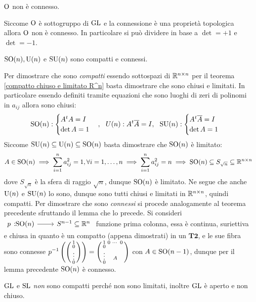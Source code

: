 \begin{corollary}
	$\operatorname{O}$ non è connesso.	
\end{corollary}
\begin{demonstration}
	Siccome $\operatorname{O}$ è sottogruppo di $\operatorname{GL}$ e la connessione è una proprietà topologica allora $\operatorname{O}$ non è connesso. In particolare si può dividere in base a $\det =+1$ e $\det =-1$.
\end{demonstration}

\begin{theorema}
	$\operatorname{SO}(n), \operatorname{U}(n)	$ e $\operatorname{SU}(n)$ sono compatti e connessi.
\end{theorema}
\begin{demonstration}
	Per dimostrare che sono \textit{compatti} essendo sottospazi di $\mathbb{R}^{n\times n}$ per il teorema \ref{compatto chiuso e limitato R^n} basta dimostrare che sono chiusi e limitati. In particolare essendo definiti tramite equazioni che sono luoghi di zeri di polinomi in $a_{ij}$ allora sono chiusi:
		\begin{gather*}
			\operatorname{SO}(n):\begin{cases}
					A^{t}A=I\\
					\det A=1
				\end{cases}, \ \
			U(n): A^{t}\overline{A}=I, \ \
			\operatorname{SU}(n): \begin{cases}
				A^{t}\overline{A}=I\\
				\det A=1
			\end{cases}
		\end{gather*}
	Siccome $\operatorname{SU}(n)\subseteq \operatorname{U}(n)\subseteq \operatorname{SO}(n)$ basta dimostrare che $\operatorname{SO}(n)$ è limitato:
		\begin{gather*}
			A\in\operatorname{SO}(n) \implies \sum_{i=1}^n a_{ij}^2=1, \forall i=1,\dots,n \implies \sum_{i=1}^n a_{ij}^2=n \implies \operatorname{SO}(n)\subseteq S_{\sqrt{n}}\subseteq\mathbb{R}^{n\times n}\\
		\end{gather*}
	dove $S_{\sqrt{n}}$ è la sfera di raggio $\sqrt{n}$, dunque $\operatorname{SO}(n)$ è limitato. Ne segue che anche $\operatorname{U}(n)$ e $\operatorname{SU}(n)$ lo sono, dunque sono tutti chiusi e limitati in $\mathbb{R}^{n\times n}$, quindi compatti. \newline
	Per dimostrare che sono \textit{connessi} si procede analogamente al teorema precedente sfruttando il lemma che lo precede. Si consideri $\funz p {\So(n)} {S^{n-1}\subseteq \realset^n}$ funzione prima colonna, essa è continua, suriettiva e chiusa in quanto è un compatto (appena dimostrati) in un $\textbf{T2}$, e le sue fibra sono connesse $\displaystyle p^{-1}\left( \begin{psmallmatrix} 1 \\ 0 \\ \vdots \\ 0 \end{psmallmatrix} \right) = \begin{psmallmatrix}
		1      & 0 & \cdots & 0\\
		0      &   &       &  \\
		\vdots &   & A     &  \\
		0      &   &       &
	\end{psmallmatrix}$ con $A\in \operatorname{SO}(n-1)$, dunque per il lemma precedente $\operatorname{SO}(n)$ è connesso.
\end{demonstration}

\begin{observe}
	$\operatorname{GL}$ e $\operatorname{SL}$ \textit{non} sono compatti perché non sono limitati, inoltre $\operatorname{GL}$ è aperto e non chiuso.
\end{observe}